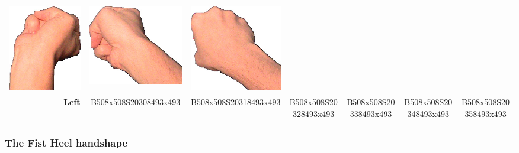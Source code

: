\documentclass{article}
\begin{document}
\begin{center}
\begin{tabular}{r*{6}{c}}
\includegraphics[scale=0.1]{images/10-06-4.jpg}&
\includegraphics[scale=0.1]{images/10-06-5.jpg}&
\includegraphics[scale=0.1]{images/10-06-6.jpg}\\
\textbf{Left}&
B508x508S20308493x493&
B508x508S20318493x493&
B508x508S20328493x493&
B508x508S20338493x493&
B508x508S20348493x493&
B508x508S20358493x493\\
\end{tabular}
\end{center}

\subsubsection{The Fist Heel handshape}
\end{document}
